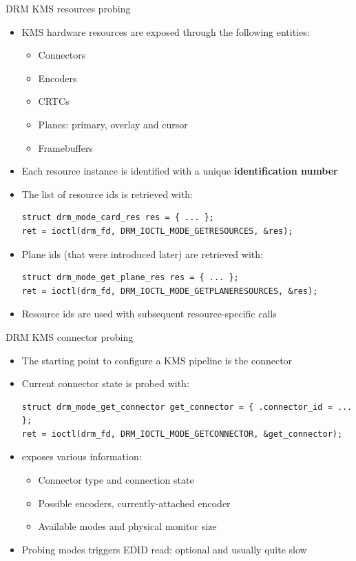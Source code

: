 \begin{frame}[fragile]{DRM KMS resources probing}
  \begin{itemize}
  \item KMS hardware resources are exposed through the following entities:
    \begin{itemize}
    \item Connectors
    \item Encoders
    \item CRTCs
    \item Planes: primary, overlay and cursor
    \item Framebuffers
    \end{itemize}
  \item Each resource instance is identified with a unique \textbf{identification number}
  \item The list of resource ids is retrieved with:
  \begin{verbatim}
struct drm_mode_card_res res = { ... };
ret = ioctl(drm_fd, DRM_IOCTL_MODE_GETRESOURCES, &res);
  \end{verbatim}
  \item Plane ids (that were introduced later) are retrieved with:
  \begin{verbatim}
struct drm_mode_get_plane_res res = { ... };
ret = ioctl(drm_fd, DRM_IOCTL_MODE_GETPLANERESOURCES, &res);
  \end{verbatim}
  \item Resource ids are used with subsequent resource-specific calls
  \end{itemize}
\end{frame}

\begin{frame}[fragile]{DRM KMS connector probing}
  \begin{itemize}
  \item The starting point to configure a KMS pipeline is the connector
  \item Current connector state is probed with:
  \begin{verbatim}
struct drm_mode_get_connector get_connector = { .connector_id = ... };
ret = ioctl(drm_fd, DRM_IOCTL_MODE_GETCONNECTOR, &get_connector);
  \end{verbatim}
  \item {} exposes various information:
    \begin{itemize}
    \item Connector type and connection state
    \item Possible encoders, currently-attached encoder
    \item Available modes and physical monitor size
    \end{itemize}
  \item Probing modes triggers EDID read: optional and usually quite slow
  \end{itemize}
\end{frame}

